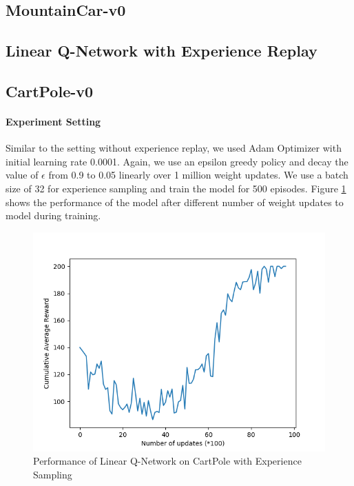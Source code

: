 \documentclass[12pt]{article}
\begin{document}
\pagebreak[4]
\subsection*{MountainCar-v0}

\pagebreak[4]

\subsection{Linear Q-Network with Experience Replay}
\subsection*{CartPole-v0}

\paragraph{Experiment Setting} Similar to the setting without experience replay, we used Adam Optimizer with initial learning rate 0.0001. Again, we use an epsilon greedy policy and decay the value of $\epsilon$ from 0.9 to 0.05 linearly over 1 million weight updates. We use a batch size of 32 for experience sampling and train the model for 500 episodes. Figure \ref{fig:02} shows the performance of the model after different number of weight updates to model during training.
\begin{figure}[h]
  \centering
  \vspace{-5mm}
  \includegraphics[width=0.8\linewidth]{figures/reward_plot_02.png}
  \caption{Performance of Linear Q-Network on CartPole with Experience Sampling}
  \label{fig:02}
\end{figure}
\end{document}
